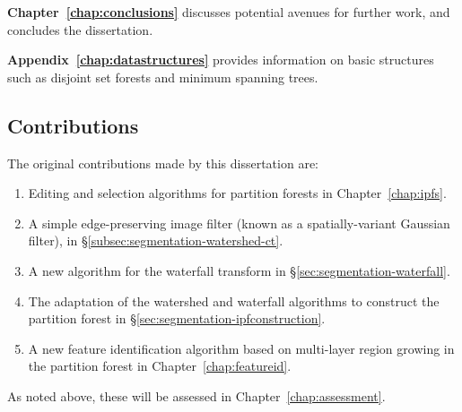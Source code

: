 \textbf{Chapter~\ref{chap:conclusions}} discusses potential avenues for further work, and concludes the dissertation.

\textbf{Appendix~\ref{chap:datastructures}} provides information on basic structures such as disjoint set forests and minimum spanning trees.

\subsection{Contributions}

The original contributions made by this dissertation are:
%
\begin{enumerate}

\item Editing and selection algorithms for partition forests in Chapter~\ref{chap:ipfs}.
\item A simple edge-preserving image filter (known as a spatially-variant Gaussian filter), in \S\ref{subsec:segmentation-watershed-ct}.
\item A new algorithm for the waterfall transform in \S\ref{sec:segmentation-waterfall}.
\item The adaptation of the watershed and waterfall algorithms to construct the partition forest in \S\ref{sec:segmentation-ipfconstruction}.
\item A new feature identification algorithm based on multi-layer region growing in the partition forest in Chapter~\ref{chap:featureid}.

\end{enumerate}
%
As noted above, these will be assessed in Chapter~\ref{chap:assessment}.